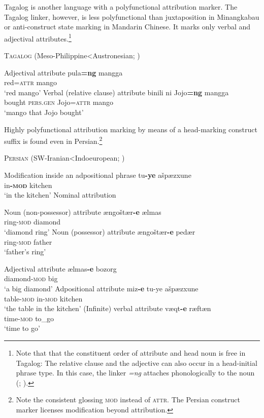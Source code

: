 Tagalog is another language with a polyfunctional attribution marker. The Tagalog linker, however, is less polyfunctional than juxtaposition in Minangkabau or anti-construct state marking in Mandarin Chinese. It marks only verbal and adjectival attributes.\footnote{Note that that the constituent order of attribute and head noun is free in Tagalog: The relative clause and the adjective can also occur in a head-initial phrase type. In this case, the linker \textit{=ng} attaches phonologically to the noun (\citealt[1]{gil2005}; \citealt[160, 162]{himmelmann1997}).}
\begin{exe}
\ex \textsc{Tagalog} (Meso-Philippine<Austronesian; \citealt[6]{gil2005}) \label{multi tagalog}
\begin{xlist}
\ex Adjectival attribute
\gll	pula\textbf{=ng} mangga\\
	red{=\textsc{attr}} mango\\
\glt	‘red mango’
\ex Verbal (relative clause) attribute
\gll	binili ni Jojo\textbf{=ng} mangga\\
	bought \textsc{pers.gen} Jojo{=\textsc{attr}} mango\\
\glt	‘mango that Jojo bought’
\end{xlist}
\end{exe}
Highly polyfunctional attribution marking by means of a head-marking construct suffix is found even in Persian.\footnote{Note the consistent glossing \textsc{mod} instead of \textsc{attr}. The Persian construct marker licenses modification beyond attribution.}
\begin{exe}
\ex \textsc{Persian} (SW-Iranian<Indoeuropean; \citealt{mahootian1997})\label{multi persian}
\begin{xlist}
\ex Modification inside an adpositional phrase
\gll	tu\textbf{-ye} ašpæzxune\\
	in\textbf{-\textsc{mod}} kitchen\\
\glt ‘in the kitchen’
\ex Nominal attribution
\begin{xlist}
\ex Noun (non-possessor) attribute
\gll 	ængoštær\textbf{-e} ælmas\\
	ring-\textsc{mod} diamond\\
\glt 	‘diamond ring’
\ex Noun (possessor) attribute
\gll	ængoštær\textbf{-e} pedær\\
	ring-\textsc{mod} father\\
\glt	‘father's ring’
\end{xlist}
\ex Adjectival attribute
\gll	ælmas\textbf{-e} bozorg\\
	diamond-\textsc{mod} big\\
\glt	‘a big diamond’
\ex Adpositional attribute
\gll	miz\textbf{-e} tu{-ye} ašpæzxune\\
	table-\textsc{mod} in{-\textsc{mod}} kitchen\\
\glt ‘the table in the kitchen’
\ex (Infinite) verbal attribute
\gll	væqt\textbf{-e} ræftæn\\
	time-\textsc{mod} to\_go\\
\glt	‘time to go’
\end{xlist}
\end{exe}
